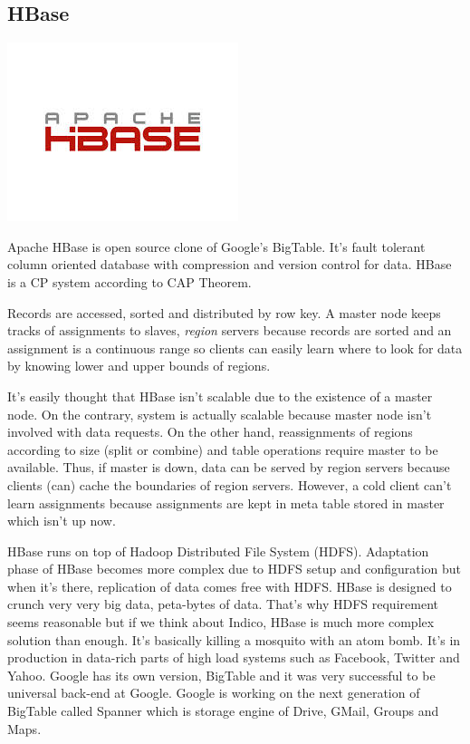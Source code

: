 \vspace{0.5cm}

\subsection{HBase}

\vspace{-1.8cm} \hspace{2.7cm} \includegraphics[scale=0.4]{3/figures/hbase.jpg} \vspace{-0.4cm}

Apache HBase is open source clone of Google's BigTable. It's fault tolerant column oriented database with compression and version control for data. HBase is a CP system according to CAP Theorem.

Records are accessed, sorted and distributed by row key. A master node keeps tracks of assignments to slaves, \textit{region} servers because records are sorted and an assignment is a continuous range so clients can easily learn where to look for data by knowing lower and upper bounds of regions.

It's easily thought that HBase isn't scalable due to the existence of a master node. On the contrary, system is actually scalable because master node isn't involved with data requests. On the other hand, reassignments of regions according to size (split or combine) and table operations require master to be available. Thus, if master is down, data can be served by region servers because clients (can) cache the boundaries of region servers. However, a cold client can't learn assignments because assignments are kept in meta table stored in master which isn't up now.

HBase runs on top of Hadoop Distributed File System (HDFS). Adaptation phase of HBase becomes more complex due to HDFS setup and configuration but when it's there, replication of data comes free with HDFS. HBase is designed to crunch very very big data, peta-bytes of data. That's why HDFS requirement seems reasonable but  if we think about Indico, HBase is much more complex solution than enough. It's basically killing a mosquito with an atom bomb. It's in production in data-rich parts of high load systems such as Facebook, Twitter and Yahoo. 
Google has its own version, BigTable and it was very successful to be universal back-end at Google. Google is working on the next generation of BigTable called Spanner which is storage engine of Drive, GMail, Groups and Maps.

